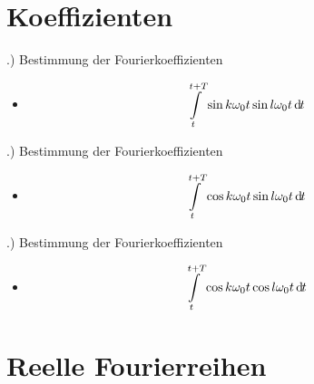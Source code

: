 \documentclass[t,14pt]{beamer}
\newcommand*\diff{\mathop{}\!\mathrm{d\hspace{-1pt}}}	%
\begin{document}
\section{Koeffizienten}
\begin{frame}{\thesection .)  Bestimmung der Fourierkoeffizienten}
    \begin{itemize}
        \item \[
        \intl_t^{t+T}\sin k\omega_0 t \sin l\omega_0 t  \diff t   
        \]
        \begin{center}
            \end{center}
    \end{itemize}
\end{frame}


\begin{frame}{\thesection .)  Bestimmung der Fourierkoeffizienten}
    \begin{itemize}
        \item \[
        \intl_t^{t+T}\cos k\omega_0 t \sin l\omega_0 t  \diff t   
        \]
        \begin{center}
            \end{center}
    \end{itemize}
\end{frame}


\begin{frame}{\thesection .)  Bestimmung der Fourierkoeffizienten}
    \begin{itemize}
        \item \[
        \intl_t^{t+T}\cos k\omega_0 t \cos l\omega_0 t  \diff t   
        \]
        \begin{center}
            \end{center}
    \end{itemize}
\end{frame}

\section{Reelle Fourierreihen}
\end{document}
